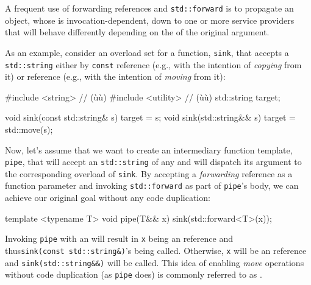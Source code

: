 A frequent use of forwarding references and \lstinline!std::forward! is to
propagate an object, whose  is
invocation-dependent, down to one or more service providers that will
behave differently depending on the  of the
original argument.

As an example, consider an overload set for a function, \lstinline!sink!,
that accepts a \lstinline!std::string! either by \lstinline!const!
 reference (e.g., with the intention of \textit{copying} from it) or
 reference (e.g., with the intention of \textit{moving} from it):

\begin{emcppshiddenlisting}[emcppsbatch=e8]
#include <string>   // (ù{}ù)
#include <utility>  // (ù{}ù)
std::string target;
\end{emcppshiddenlisting}
\begin{emcppslisting}[emcppsbatch=e8]
void sink(const std::string& s) { target = s; }
void sink(std::string&& s)      { target = std::move(s); }
\end{emcppslisting}

\noindent Now, let's assume that we want to create an intermediary function
template, \lstinline!pipe!, that will accept an \lstinline!std::string! of any
 and will dispatch its argument to the
corresponding overload of \lstinline!sink!. By accepting a
\emph{forwarding} reference as a function parameter and invoking
\lstinline!std::forward! as part of \lstinline!pipe!'s body, we can achieve
our original goal without any code duplication:

\begin{emcppslisting}[emcppsbatch=e8]
template <typename T>
void pipe(T&& x)
{
    sink(std::forward<T>(x));
}
\end{emcppslisting}

\noindent Invoking \lstinline!pipe! with an  will result in \lstinline!x!
being an  reference and thus\linebreak[4]%
\mbox{\lstinline!sink(const!~\lstinline!std::string&)!'s} being called. Otherwise,
\lstinline!x! will be an  reference and
\lstinline!sink(std::string&&)! will be called. This idea of enabling
\emph{move} operations without code duplication (as \lstinline!pipe! does)
is commonly referred to as .

